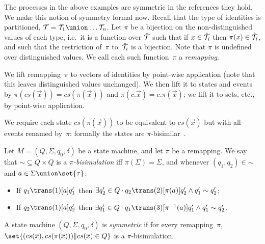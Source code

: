 The processes in the above examples are symmetric in the references they hold.
We make this notion of symmetry formal now.
%
Recall that the type of identities is partitioned, $\T
= \T_1 \union \ldots \T_n$.  Let $\pi$ be a bijection on the non-distinguished
values of each type, i.e.~it is a function over $\hat{\mathcal{T}}$ such that if
$x \in \hat{\mathcal{T}}_i$ then $\pi(x) \in \hat{\mathcal{T}}_i$, and such that the restriction
of~$\pi$ to~$\hat{\mathcal{T}}_i$ is a bijection.  Note that $\pi$ is undefined over
distinguished values.  We call each such function~$\pi$ a \emph{remapping}.

We lift remapping~$\pi$ to vectors of identities by point-wise application
(note that this leaves distinguished values unchanged).  We then lift it to
states and events by $\pi(cs(\vec{x})) = cs(\pi(\vec{x}))$ and $\pi(c.\vec{x})
= c.\pi(\vec{x})$; we lift it to sets, etc., by point-wise application.

We require each state $cs(\pi(\vec{x}))$ to be equivalent to $cs(\vec{x})$ but
with all events renamed by~$\pi$: formally the states are
$\pi$-bisimilar~\cite{moffat-symmetry}.
%
\begin{definition}
\label{def:pi-bisimilar}
Let $M = (Q, \Sigma, q_0, \delta)$ be a state machine, and let $\pi$ be a
remapping.  We say that $\mathord{\sim} \subseteq Q \times Q$ is
a \emph{$\pi$-bisimulation} iff $\pi(\Sigma) = \Sigma$, and whenever $(q_1,
q_2) \in \mathord{\sim}$ and $a \in \Sigma \union \set{\tau}$:
%
\begin{itemize}
\item If $q_1\trans(1)[a] q_1'$ then
$\exists q_2' \in Q \cdot q_2 \trans(2)[\pi(a)] q_2' \land q_1' \sim q_2'$;

\item If $q_2 \trans(1)[a] q_2'$ then
$\exists q_1' \in Q \cdot q_1 \trans(3)[\pi^{-1}(a)] q_1' \land q_1' \sim q_2'$.
\end{itemize}
\end{definition}

\begin{definition}
\label{def:symmetric-state-machine}
A state machine $(Q, \Sigma, q_0, \delta)$ is \emph{symmetric} if for
every remapping~$\pi$,\, 
$\set{ (cs(\vec{x}), cs(\pi(\vec{x}))) \| cs(\vec{x}) \in Q}$ is a
$\pi$-bisimulation.
\end{definition}

